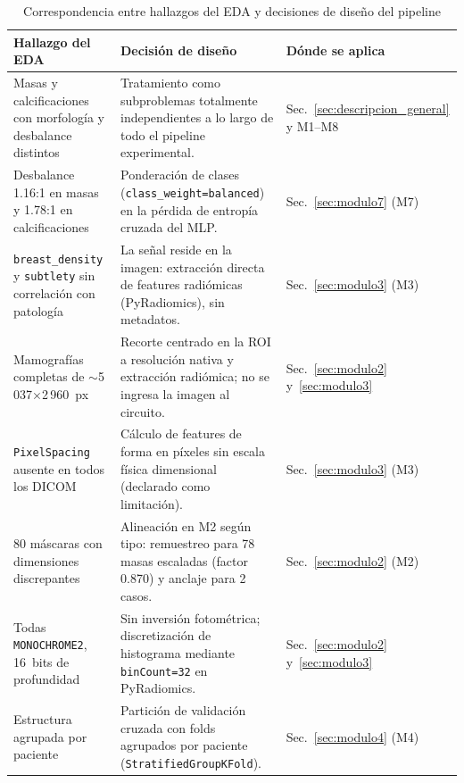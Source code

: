 \begin{table}[htbp]
\centering
\caption{Correspondencia entre hallazgos del EDA y decisiones de diseño del pipeline}
\label{tab:eda_implicaciones_diseno}
\begin{tabularx}{\textwidth}{@{}X X p{3cm}@{}}
\toprule
\textbf{Hallazgo del EDA} & \textbf{Decisión de diseño} & \textbf{Dónde se aplica} \\
\midrule
Masas y calcificaciones con morfología y desbalance distintos &
Tratamiento como subproblemas totalmente independientes a lo largo de todo el pipeline experimental. &
Sec.~\ref{sec:descripcion_general} y M1--M8 \\
Desbalance 1.16:1 en masas y 1.78:1 en calcificaciones &
Ponderación de clases (\texttt{class\_weight=balanced}) en la pérdida de entropía cruzada del MLP. &
Sec.~\ref{sec:modulo7} (M7) \\
\texttt{breast\_density} y \texttt{subtlety} sin correlación con patología &
La señal reside en la imagen: extracción directa de features radiómicas (PyRadiomics), sin metadatos. &
Sec.~\ref{sec:modulo3} (M3) \\
Mamografías completas de $\sim$5\,037$\times$2\,960~px &
Recorte centrado en la ROI a resolución nativa y extracción radiómica; no se ingresa la imagen al circuito. &
Sec.~\ref{sec:modulo2} y~\ref{sec:modulo3} \\
\texttt{PixelSpacing} ausente en todos los DICOM &
Cálculo de features de forma en píxeles sin escala física dimensional (declarado como limitación). &
Sec.~\ref{sec:modulo3} (M3) \\
80 máscaras con dimensiones discrepantes &
Alineación en M2 según tipo: remuestreo para 78 masas escaladas (factor 0.870) y anclaje para 2 casos. &
Sec.~\ref{sec:modulo2} (M2) \\
Todas \texttt{MONOCHROME2}, 16~bits de profundidad &
Sin inversión fotométrica; discretización de histograma mediante \texttt{binCount=32} en PyRadiomics. &
Sec.~\ref{sec:modulo2} y~\ref{sec:modulo3} \\
Estructura agrupada por paciente &
Partición de validación cruzada con folds agrupados por paciente (\texttt{StratifiedGroupKFold}). &
Sec.~\ref{sec:modulo4} (M4) \\
\bottomrule
\end{tabularx}
\end{table}
